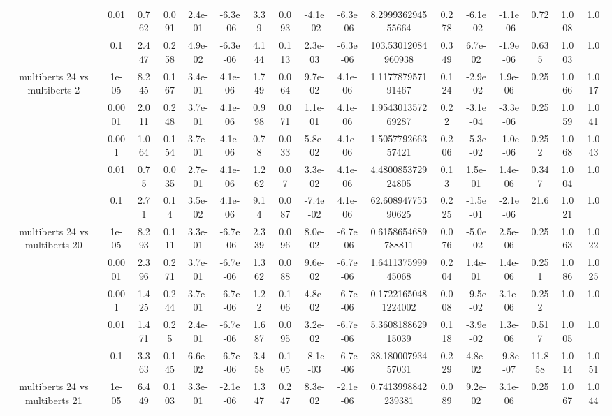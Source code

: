 \begin{tabular}{|c|c|c|c|c|c|c|c|c|c|c|c|c|c|c|c|c|}
 & 0.01 & 0.762 & 0.091 & 2.4e-01 & -6.3e-06 & 3.39 & 0.093 & -4.1e-02 & -6.3e-06 & 8.299936294555664 & 0.278 & -6.1e-02 & -1.1e-06 & 0.72 & 1.008 & 1.0 \\
 & 0.1 & 2.447 & 0.258 & 4.9e-02 & -6.3e-06 & 4.144 & 0.113 & 2.3e-03 & -6.3e-06 & 103.53012084960938 & 0.349 & 6.7e-02 & -1.9e-06 & 0.635 & 1.003 & 1.0 \\
\hline
\multirow{5}{*}{multiberts 24 vs multiberts 2} & 1e-05 & 8.245 & 0.167 & 3.4e-01 & 4.1e-06 & 1.749 & 0.064 & 9.7e-02 & 4.1e-06 & 1.117787957191467 & 0.124 & -2.9e-02 & 1.9e-06 & 0.25 & 1.066 & 1.017 \\
 & 0.0001 & 2.011 & 0.248 & 3.7e-01 & 4.1e-06 & 0.998 & 0.071 & 1.1e-01 & 4.1e-06 & 1.954301357269287 & 0.22 & -3.1e-04 & -3.3e-06 & 0.25 & 1.059 & 1.041 \\
 & 0.001 & 1.064 & 0.154 & 3.7e-01 & 4.1e-06 & 0.78 & 0.033 & 5.8e-02 & 4.1e-06 & 1.505779266357421 & 0.206 & -5.3e-02 & -1.0e-06 & 0.252 & 1.068 & 1.043 \\
 & 0.01 & 0.75 & 0.035 & 2.7e-01 & 4.1e-06 & 1.262 & 0.07 & 3.3e-02 & 4.1e-06 & 4.480085372924805 & 0.13 & 1.5e-01 & 1.4e-06 & 0.347 & 1.004 & 1.0 \\
 & 0.1 & 2.71 & 0.14 & 3.5e-02 & 4.1e-06 & 9.14 & 0.087 & -7.4e-02 & 4.1e-06 & 62.60894775390625 & 0.225 & -1.5e-01 & -2.1e-06 & 21.6 & 1.021 & 1.0 \\
\hline
\multirow{5}{*}{multiberts 24 vs multiberts 20} & 1e-05 & 8.293 & 0.111 & 3.3e-01 & -6.7e-06 & 2.339 & 0.096 & 8.0e-02 & -6.7e-06 & 0.6158654689788811 & 0.076 & -5.0e-02 & 2.5e-06 & 0.25 & 1.063 & 1.022 \\
 & 0.0001 & 2.396 & 0.271 & 3.7e-01 & -6.7e-06 & 1.362 & 0.088 & 9.6e-02 & -6.7e-06 & 1.641137599945068 & 0.204 & 1.4e-01 & 1.4e-06 & 0.251 & 1.086 & 1.025 \\
 & 0.001 & 1.425 & 0.244 & 3.7e-01 & -6.7e-06 & 1.22 & 0.106 & 4.8e-02 & -6.7e-06 & 0.17221650481224002 & 0.008 & -9.5e-02 & 3.1e-06 & 0.252 & 1.0 & 1.0 \\
 & 0.01 & 1.471 & 0.25 & 2.4e-01 & -6.7e-06 & 1.687 & 0.095 & 3.2e-02 & -6.7e-06 & 5.360818862915039 & 0.118 & -3.9e-02 & 1.3e-06 & 0.517 & 1.005 & 1.0 \\
 & 0.1 & 3.363 & 0.145 & 6.6e-02 & -6.7e-06 & 3.458 & 0.105 & -8.1e-03 & -6.7e-06 & 38.18000793457031 & 0.229 & 4.8e-02 & -9.8e-07 & 11.858 & 1.014 & 1.051 \\
\hline
\multirow{5}{*}{multiberts 24 vs multiberts 21} & 1e-05 & 6.449 & 0.103 & 3.3e-01 & -2.1e-06 & 1.347 & 0.247 & 8.3e-02 & -2.1e-06 & 0.7413998842239381 & 0.089 & 9.2e-02 & 3.1e-06 & 0.25 & 1.067 & 1.044 \\

\end{tabular}
